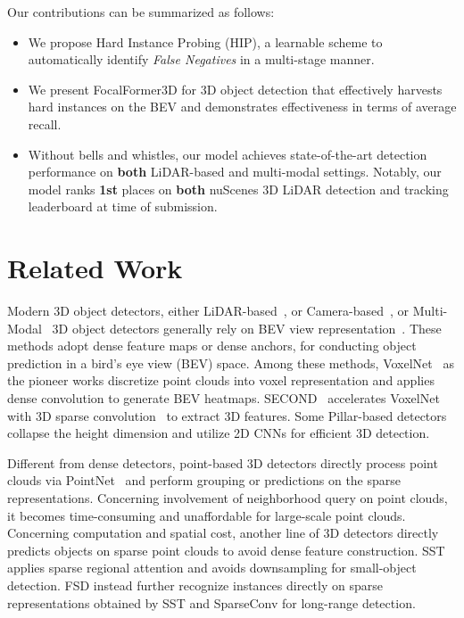 \documentclass[10pt,twocolumn,letterpaper]{article}
\begin{document}
Our contributions can be summarized as follows:
\begin{itemize}
    \item We propose Hard Instance Probing (HIP), a learnable scheme to automatically identify \textit{False Negatives} in a multi-stage manner. 
    \item We present FocalFormer3D for 3D object detection that effectively harvests hard instances on the BEV and demonstrates effectiveness in terms of average recall.
    \item Without bells and whistles, our model achieves state-of-the-art detection performance on \textbf{both} LiDAR-based and multi-modal settings. Notably, our model ranks \textbf{1st} places on \textbf{both} nuScenes 3D LiDAR detection and tracking leaderboard at time of submission.
\end{itemize}

\section{Related Work}
Modern 3D object detectors, either LiDAR-based~\cite{VoxelNet, pointpillar, second, centerpoint, PIXOR, pvrcnn, fastpointrcnn, voxelrcnn, pvrcnn++, centerformer, focalsconv, largekernel3d, chen2023voxenext}, or Camera-based~\cite{oftnet, chen2020dsgn, liftsplatshoot, li2022bevformer, zhang2022beverse, huang2021bevdet, liu2022petr, chen2022dsgn++}, or Multi-Modal~\cite{transfusion, bevfusion, bevfusionmit, li2022uvtr, li2022vff, 4dnet, li2022deepfusion, chen2022autoalignv2, mvp, futr3d, MV3D, MMF, contfuse} 3D object detectors generally rely on BEV view representation~\cite{li2022delving}. These methods adopt dense feature maps or dense anchors, for conducting object prediction in a bird's eye view (BEV) space. Among these methods, VoxelNet~\cite{second} as the pioneer works discretize point clouds into voxel representation and applies dense convolution to generate BEV heatmaps. SECOND~\cite{second} accelerates VoxelNet with 3D sparse convolution~\cite{sparseconv} to extract 3D features. Some Pillar-based detectors~\cite{pointpillar, PIXOR, shi2022pillarnet, ge2020afdet} collapse the height dimension and utilize 2D CNNs for efficient 3D detection. 

Different from dense detectors, point-based 3D detectors \cite{pointrcnn, 3dssd, std, votenet} directly process point clouds via PointNet~\cite{pointnet, pointnet++} and perform grouping or predictions on the sparse representations. Concerning involvement of neighborhood query on point clouds, it becomes time-consuming and unaffordable for large-scale point clouds. Concerning computation and spatial cost, another line of 3D detectors directly predicts objects on sparse point clouds to avoid dense feature construction. SST \cite{sst} applies sparse regional attention and avoids downsampling for small-object detection. FSD \cite{fan2022fully} instead further recognize instances directly on sparse representations obtained by SST \cite{sst} and SparseConv for long-range detection. 
\end{document}
